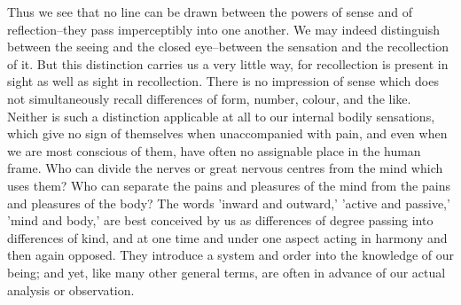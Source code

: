 Thus we see that no line can be drawn between the powers of sense and
of reflection--they pass imperceptibly into one another. We may indeed
distinguish between the seeing and the closed eye--between the sensation
and the recollection of it. But this distinction carries us a very
little way, for recollection is present in sight as well as sight
in recollection. There is no impression of sense which does not
simultaneously recall differences of form, number, colour, and the like.
Neither is such a distinction applicable at all to our internal bodily
sensations, which give no sign of themselves when unaccompanied with
pain, and even when we are most conscious of them, have often no
assignable place in the human frame. Who can divide the nerves or great
nervous centres from the mind which uses them? Who can separate the
pains and pleasures of the mind from the pains and pleasures of the
body? The words 'inward and outward,' 'active and passive,' 'mind and
body,' are best conceived by us as differences of degree passing into
differences of kind, and at one time and under one aspect acting in
harmony and then again opposed. They introduce a system and order into
the knowledge of our being; and yet, like many other general terms, are
often in advance of our actual analysis or observation.

